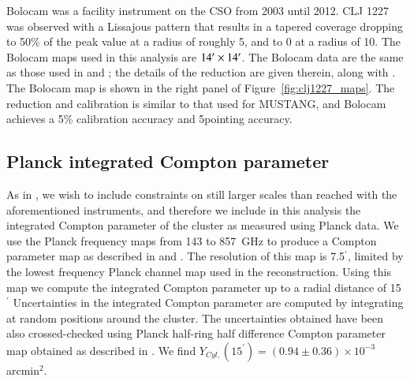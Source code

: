 \documentclass[twocolumn,traditabstract]{aa}
\begin{document}
Bolocam was a facility instrument on the CSO from
2003 until 2012. CLJ 1227 was observed with a Lissajous pattern that results in a tapered
coverage dropping to 50\% of the peak value at a radius of roughly 5\amin, and to 0 at a radius of 10\amin.
The Bolocam maps used in this analysis are $14\hbox{$^\prime$} \times 14\hbox{$^\prime$}$. The Bolocam data 
are the same as those used in \citet{czakon2015} and \citet{sayers2013}; the details of the reduction are 
given therein, along with \citet{sayers2011}. The Bolocam map is shown in the right panel of Figure~\ref{fig:clj1227_maps}.
The reduction and calibration is similar to that used for MUSTANG, and Bolocam achieves a 
5\% calibration accuracy and 5\asecs pointing accuracy.


\subsection{Planck integrated Compton parameter}
\label{sec:picp}

As in \citet{adam2015}, we wish to include constraints on still larger scales than reached with the aforementioned instruments,
and therefore we include in this analysis the integrated Compton parameter of the cluster as measured using Planck data.
We use the Planck frequency maps from 143 to 857~GHz to produce a Compton parameter map as described in \citet{hurier2013} and
\citet{planck2013ymap,planck2016_tsz}. The resolution of this map is 7.5$^{\prime}$, limited by the lowest frequency Planck channel
map used in the reconstruction. Using this map we compute the integrated Compton parameter up to a radial distance of 15$^{\prime}$
Uncertainties in the integrated Compton parameter are computed by integrating at random positions
around the cluster. The uncertainties obtained have been also crossed-checked using Planck half-ring half difference Compton parameter
map
obtained as described in \citet{planck2013ymap,planck2016_tsz}. We find $Y_{Cyl,}(15^{\prime}) = (0.94 \pm 0.36) \times 10^{-3}$ arcmin$^2$. 
\end{document}
